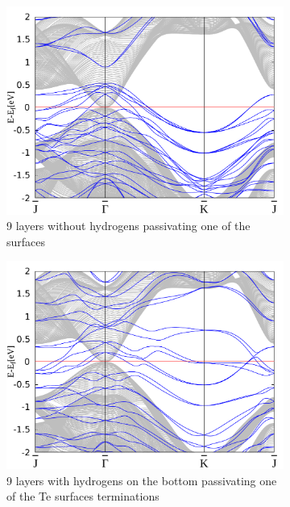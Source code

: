 \begin{figure}[htbp]
\begin{subfigure}[c]{.48\linewidth}
			\centering
			\includegraphics[width=\linewidth]{Te_termination/no_H_bulk+9_layers_no_dos_-2_2.pdf}
			\caption{9 layers without hydrogens passivating one of the surfaces}
		\end{subfigure}
		\hfill
		\begin{subfigure}[c]{.48\linewidth}
			\centering
			\includegraphics[width=\linewidth]{Te_termination/bulk+9_layers_no_dos_-2_2.pdf}
			\caption{9 layers with hydrogens on the bottom passivating one of the Te surfaces terminations}
		\end{subfigure}
		\begin{subfigure}[c]{.48\linewidth}
			\centering 

\end{subfigure}
\end{figure}
